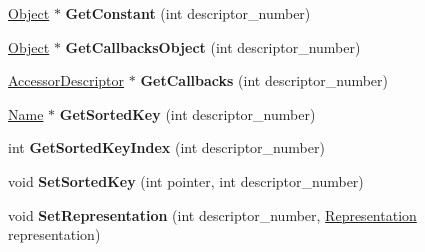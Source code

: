 \begin{DoxyCompactItemize}
\item 
\hyperlink{classv8_1_1internal_1_1_object}{Object} $\ast$ {\bfseries Get\+Constant} (int descriptor\+\_\+number)\hypertarget{classv8_1_1internal_1_1_descriptor_array_ab822082a28de000bed2d98b7360035c0}{}\label{classv8_1_1internal_1_1_descriptor_array_ab822082a28de000bed2d98b7360035c0}

\item 
\hyperlink{classv8_1_1internal_1_1_object}{Object} $\ast$ {\bfseries Get\+Callbacks\+Object} (int descriptor\+\_\+number)\hypertarget{classv8_1_1internal_1_1_descriptor_array_adb31a9e628a6bfb4ccb7c977970a1310}{}\label{classv8_1_1internal_1_1_descriptor_array_adb31a9e628a6bfb4ccb7c977970a1310}

\item 
\hyperlink{structv8_1_1internal_1_1_accessor_descriptor}{Accessor\+Descriptor} $\ast$ {\bfseries Get\+Callbacks} (int descriptor\+\_\+number)\hypertarget{classv8_1_1internal_1_1_descriptor_array_a720de734fef0a0710d9c3f950acd224b}{}\label{classv8_1_1internal_1_1_descriptor_array_a720de734fef0a0710d9c3f950acd224b}

\item 
\hyperlink{classv8_1_1internal_1_1_name}{Name} $\ast$ {\bfseries Get\+Sorted\+Key} (int descriptor\+\_\+number)\hypertarget{classv8_1_1internal_1_1_descriptor_array_ab4b3c4256d1359e058535e8a3ab9a62e}{}\label{classv8_1_1internal_1_1_descriptor_array_ab4b3c4256d1359e058535e8a3ab9a62e}

\item 
int {\bfseries Get\+Sorted\+Key\+Index} (int descriptor\+\_\+number)\hypertarget{classv8_1_1internal_1_1_descriptor_array_a36c2656a9bf52ef6bb516cfd1ab79cb7}{}\label{classv8_1_1internal_1_1_descriptor_array_a36c2656a9bf52ef6bb516cfd1ab79cb7}

\item 
void {\bfseries Set\+Sorted\+Key} (int pointer, int descriptor\+\_\+number)\hypertarget{classv8_1_1internal_1_1_descriptor_array_a621c6edb83af3d30bccefbfee213df39}{}\label{classv8_1_1internal_1_1_descriptor_array_a621c6edb83af3d30bccefbfee213df39}

\item 
void {\bfseries Set\+Representation} (int descriptor\+\_\+number, \hyperlink{classv8_1_1internal_1_1_representation}{Representation} representation)\hypertarget{classv8_1_1internal_1_1_descriptor_array_a3a00920b2822302d03addd2bc48536a1}{}\label{classv8_1_1internal_1_1_descriptor_array_a3a00920b2822302d03addd2bc48536a1}


\end{DoxyCompactItemize}
